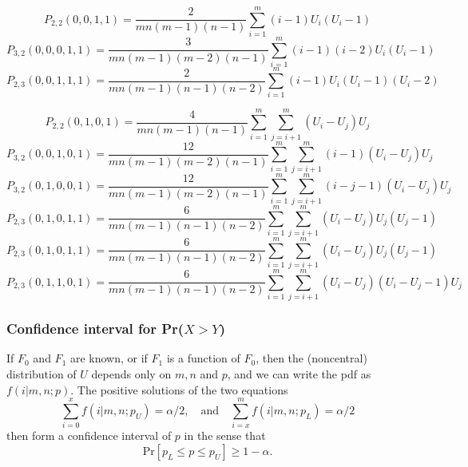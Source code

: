 \begin{equation}
	P_{2,2}(0,0,1,1) = \frac{2}{mn(m-1)(n-1)} \sum_{i=1}^m (i-1)U_i(U_i-1)
\end{equation}
\begin{equation}
	P_{3,2}(0,0,0,1,1) = \frac{3}{mn(m-1)(m-2)(n-1)} \sum_{i=1}^m (i-1)(i-2)U_i(U_i-1)
\end{equation}
\begin{equation}
	P_{2,3}(0,0,1,1,1) = \frac{2}{mn(m-1)(n-1)(n-2)} \sum_{i=1}^m (i-1)U_i(U_i-1)(U_i-2)
\end{equation}

\begin{equation}
	P_{2,2}(0,1,0,1) = \frac{4}{mn(m-1)(n-1)} \sum_{i=1}^m  \sum_{j=i+1}^m (U_i - U_j) U_j
\end{equation}
\begin{equation}
	P_{3,2}(0,0,1,0,1) = \frac{12}{mn(m-1)(m-2)(n-1)} \sum_{i=1}^m  \sum_{j=i+1}^m (i-1)(U_i - U_j) U_j
\end{equation}
\begin{equation}
	P_{3,2}(0,1,0,0,1) = \frac{12}{mn(m-1)(m-2)(n-1)} \sum_{i=1}^m  \sum_{j=i+1}^m (i-j-1)(U_i - U_j) U_j
\end{equation}
\begin{equation}
	P_{2,3}(0,1,0,1,1) = \frac{6}{mn(m-1)(n-1)(n-2)} \sum_{i=1}^m  \sum_{j=i+1}^m (U_i - U_j) U_j (U_j-1)
\end{equation}
\begin{equation}
	P_{2,3}(0,1,0,1,1) = \frac{6}{mn(m-1)(n-1)(n-2)} \sum_{i=1}^m  \sum_{j=i+1}^m (U_i - U_j) U_j (U_j - 1)
\end{equation}
\begin{equation}
	P_{2,3}(0,1,1,0,1) = \frac{6}{mn(m-1)(n-1)(n-2)} \sum_{i=1}^m  \sum_{j=i+1}^m (U_i - U_j) (U_i - U_j - 1) U_j 
\end{equation}


\subsubsection{Confidence interval for Pr($X>Y$)}
If $F_0$ and $F_1$ are known, or if $F_1$ is a function of $F_0$, then the (noncentral) distribution of $U$ depends only on $m,n$ and $p$, and we can write the pdf as $f(i \vert m,n;p)$. The positive solutions of the two equations 
\begin{equation}
	\sum_{i=0}^x f(i \vert m,n;p_U) = \alpha/2, \quad \text{and} \quad \sum_{i=x}^m f(i \vert m,n;p_L) = \alpha/2
\end{equation}
then form a confidence interval of $p$ in the sense that
\begin{equation}
	\text{Pr}[p_L \leq p \leq p_U ] \geq 1 - \alpha.
\end{equation}






